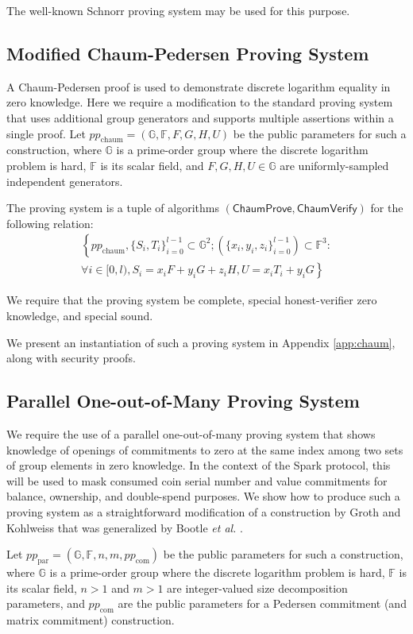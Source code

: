 \documentclass{llncs}
\newcommand{\G}{\mathbb{G}}
\newcommand{\F}{\mathbb{F}}
\newcommand{\func}[1]{\mathsf{#1}}
\begin{document}
The well-known Schnorr proving system may be used for this purpose.


\subsection{Modified Chaum-Pedersen Proving System}

A Chaum-Pedersen proof is used to demonstrate discrete logarithm equality in zero knowledge.
Here we require a modification to the standard proving system that uses additional group generators and supports multiple assertions within a single proof.
Let $pp_{\text{chaum}} = (\G, \F, F, G, H, U)$ be the public parameters for such a construction, where $\G$ is a prime-order group where the discrete logarithm problem is hard, $\F$ is its scalar field, and $F,G,H,U \in \G$ are uniformly-sampled independent generators.

The proving system is a tuple of algorithms $(\func{ChaumProve},\func{ChaumVerify})$ for the following relation:
\begin{multline*}
\left\{ pp_{\text{chaum}}, \{S_i, T_i\}_{i=0}^{l-1} \subset \G^2 ; (\{x_i, y_i, z_i\}_{i=0}^{l-1}) \subset \F^3 : \right. \\
\left. \forall i \in [0,l), S_i = x_i F + y_i G + z_i H, U = x_i T_i + y_i G \right\}
\end{multline*}

We require that the proving system be complete, special honest-verifier zero knowledge, and special sound.

We present an instantiation of such a proving system in Appendix \ref{app:chaum}, along with security proofs.


\subsection{Parallel One-out-of-Many Proving System}

We require the use of a parallel one-out-of-many proving system that shows knowledge of openings of commitments to zero at the same index among two sets of group elements in zero knowledge.
In the context of the Spark protocol, this will be used to mask consumed coin serial number and value commitments for balance, ownership, and double-spend purposes.
We show how to produce such a proving system as a straightforward modification of a construction by Groth and Kohlweiss \cite{groth} that was generalized by Bootle \textit{et al.} \cite{bootle}.

Let $pp_{\text{par}} = (\G, \F, n, m, pp_{\text{com}})$ be the public parameters for such a construction, where $\G$ is a prime-order group where the discrete logarithm problem is hard, $\F$ is its scalar field, $n > 1$ and $m > 1$ are integer-valued size decomposition parameters, and $pp_{\text{com}}$ are the public parameters for a Pedersen commitment (and matrix commitment) construction.
\end{document}
